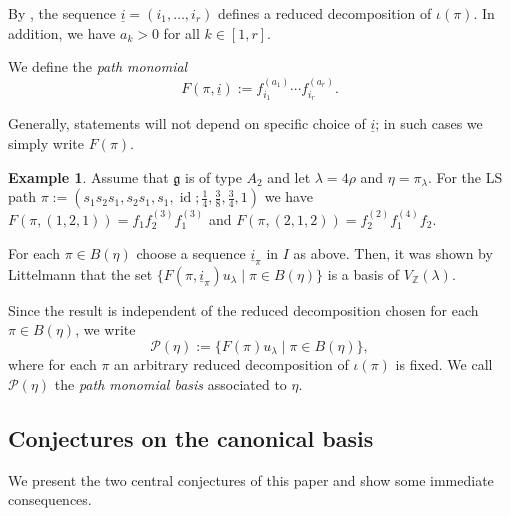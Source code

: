 \documentclass[final]{amsart}
\theoremstyle{plain}
\theoremstyle{definition}
\newtheorem{example}[corollary]{Example}
\newcommand{\calP}{\mathcal P}
\newcommand{\bbZ}{\mathbb Z}
\newcommand{\frakg}{\mathfrak g}
\newcommand{\uli}{{\underline i}}
\DeclareMathOperator{\id}{id}
\begin{document}
By \cite{Littelmann:PlacticAlgebra-SemisimpleLieAlgebras}, the sequence $\uli = (i_1, \dots, i_r)$ defines a reduced decomposition of $\iota(\pi)$.
In addition, we have $a_k > 0$ for all $k \in [1, r]$.

We define the \emph{path monomial}
\begin{equation}
    F(\pi, \uli) := f_{i_1}^{(a_1)} \cdots f_{i_r}^{(a_r)}.
\end{equation}

Generally, statements will not depend on specific choice of $\uli$; in such cases we simply write $F(\pi)$.

\begin{example}
    Assume that $\frakg$ is of type $A_2$ and let $\lambda = 4\rho$ and $\eta = \pi_\lambda$.
    For the LS path $\pi := (s_1s_2s_1, s_2s_1, s_1, \id; \tfrac14, \tfrac38, \tfrac34, 1)$ we have $F(\pi, (1,2,1)) = f_1 f_2^{(3)} f_1^{(3)}$ and $F(\pi, (2,1,2)) = f_2^{(2)} f_1^{(4)} f_2$.
\end{example}

For each $\pi \in B(\eta)$ choose a sequence $\uli_\pi$ in $I$ as above.
Then, it was shown by Littelmann \cite{Littelmann:ContractingModules-StandardMonomialTheory} that the set $\{ F(\pi, \uli_\pi) u_\lambda \mid \pi \in B(\eta) \}$ is a basis of $V_\bbZ(\lambda)$.

Since the result is independent of the reduced decomposition chosen for each $\pi \in B(\eta)$, we write
\begin{equation}
    \calP(\eta) := \{ F(\pi) u_\lambda \mid \pi \in B(\eta) \},
\end{equation}
where for each $\pi$ an arbitrary reduced decomposition of $\iota(\pi)$ is fixed.
We call $\calP(\eta)$ the \emph{path monomial basis} associated to $\eta$.

\subsection{Conjectures on the canonical basis}
\label{section:conjectures-on-canonical-basis}

We present the two central conjectures of this paper and show some immediate consequences.
\end{document}
